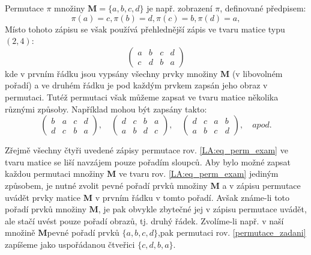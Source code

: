       \begin{example}%
        Permutace $\pi$ množiny $\mathbf{M}= \lbrace a,b,c,d\rbrace$ je např. zobrazení 
        $\pi$, definované předpisem:
        \begin{equation}\label{permutace_zadani}
          \pi\left(a\right) = c, \pi\left(b\right) = d, \pi\left(c\right) = b, \pi\left(d\right) = a,
        \end{equation}
        Místo tohoto zápisu se však používá přehlednější zápis ve tvaru matice typu
        $\left(2,4\right)$:
        \begin{equation}\label{LA:eq_perm_exam}
          \left(
            \begin{array}{cccc}
            a & b & c & d \\
            c & d & b & a
            \end{array}
          \right)
        \end{equation}
        kde v prvním řádku jsou vypsány všechny prvky množiny $\mathbf{M}$ (v libovolném pořadí) a ve druhém 
        řádku je pod každým prvkem zapsán jeho obraz v permutaci. Tutéž permutaci však můžeme zapsat ve tvaru 
        matice několika různými způsoby. Například mohou být zapsány takto:
        \begin{equation}
          \left(
            \begin{array}{cccc}
            b & a & c & d \\
            d & c & b & a
            \end{array}
          \right),\quad
          \left(
            \begin{array}{cccc}
            d & c & b & a \\
            a & b & d & c
            \end{array}
            \right),\quad
          \left(
            \begin{array}{cccc}
            d & c & a & b \\
            a & b & c & d
            \end{array}
          \right),\quad apod.
        \end{equation}
      \end{example}
      Zřejmě všechny čtyři uvedené zápisy permutace rov. \ref{LA:eq_perm_exam} ve tvaru matice se liší 
      navzájem pouze pořadím sloupců. Aby bylo možné zapsat každou permutaci množiny $\mathbf{M}$ ve tvaru 
      rov. \ref{LA:eq_perm_exam} jediným způsobem, je nutné zvolit pevné pořadí prvků množiny $\mathbf{M}$  a 
      v zápisu permutace uvádět prvky matice $\mathbf{M}$  v prvním řádku v tomto pořadí. Avšak známe-li toto 
      pořadí prvků množiny $\mathbf{M}$, je pak obvykle zbytečné jej v zápisu permutace uvádět, ale stačí 
      uvést pouze pořadí obrazů, tj. druhý řádek. Zvolíme-li např. v naší množině $\mathbf{M}$pevné pořadí 
      prvků $\lbrace a,b,c,d\rbrace$,pak permutaci rov. \ref{permutace_zadani} zapíšeme jako uspořádanou 
      čtveřici $\lbrace c,d,b,a\rbrace$.
  
